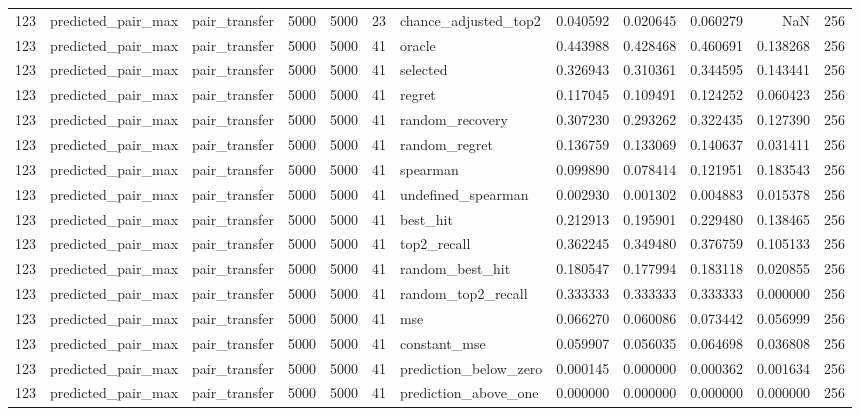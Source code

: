 \begin{tabular}{rllrrrlrrrrr}
123 & predicted_pair_max & pair_transfer & 5000 & 5000 & 23 & chance_adjusted_top2 & 0.040592 & 0.020645 & 0.060279 & NaN & 256 \\
123 & predicted_pair_max & pair_transfer & 5000 & 5000 & 41 & oracle & 0.443988 & 0.428468 & 0.460691 & 0.138268 & 256 \\
123 & predicted_pair_max & pair_transfer & 5000 & 5000 & 41 & selected & 0.326943 & 0.310361 & 0.344595 & 0.143441 & 256 \\
123 & predicted_pair_max & pair_transfer & 5000 & 5000 & 41 & regret & 0.117045 & 0.109491 & 0.124252 & 0.060423 & 256 \\
123 & predicted_pair_max & pair_transfer & 5000 & 5000 & 41 & random_recovery & 0.307230 & 0.293262 & 0.322435 & 0.127390 & 256 \\
123 & predicted_pair_max & pair_transfer & 5000 & 5000 & 41 & random_regret & 0.136759 & 0.133069 & 0.140637 & 0.031411 & 256 \\
123 & predicted_pair_max & pair_transfer & 5000 & 5000 & 41 & spearman & 0.099890 & 0.078414 & 0.121951 & 0.183543 & 256 \\
123 & predicted_pair_max & pair_transfer & 5000 & 5000 & 41 & undefined_spearman & 0.002930 & 0.001302 & 0.004883 & 0.015378 & 256 \\
123 & predicted_pair_max & pair_transfer & 5000 & 5000 & 41 & best_hit & 0.212913 & 0.195901 & 0.229480 & 0.138465 & 256 \\
123 & predicted_pair_max & pair_transfer & 5000 & 5000 & 41 & top2_recall & 0.362245 & 0.349480 & 0.376759 & 0.105133 & 256 \\
123 & predicted_pair_max & pair_transfer & 5000 & 5000 & 41 & random_best_hit & 0.180547 & 0.177994 & 0.183118 & 0.020855 & 256 \\
123 & predicted_pair_max & pair_transfer & 5000 & 5000 & 41 & random_top2_recall & 0.333333 & 0.333333 & 0.333333 & 0.000000 & 256 \\
123 & predicted_pair_max & pair_transfer & 5000 & 5000 & 41 & mse & 0.066270 & 0.060086 & 0.073442 & 0.056999 & 256 \\
123 & predicted_pair_max & pair_transfer & 5000 & 5000 & 41 & constant_mse & 0.059907 & 0.056035 & 0.064698 & 0.036808 & 256 \\
123 & predicted_pair_max & pair_transfer & 5000 & 5000 & 41 & prediction_below_zero & 0.000145 & 0.000000 & 0.000362 & 0.001634 & 256 \\
123 & predicted_pair_max & pair_transfer & 5000 & 5000 & 41 & prediction_above_one & 0.000000 & 0.000000 & 0.000000 & 0.000000 & 256 \\

\end{tabular}
